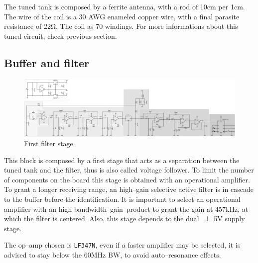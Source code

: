 The tuned tank is composed by a ferrite antenna, with a rod of \num{10}\si{\centi\meter} per \diameter \num{1}\si{\centi\meter}. The wire of the coil is a \num{30} AWG enameled copper wire, with a final parasite resistance of \num{22}\si{\ohm}. The coil as \num{70} windings. For more informations about this tuned circuit, check previous section.

\subsection{Buffer and filter}
\begin{figure}
	\centering
	\includegraphics*[viewport=170 3 1250 380,scale=0.4]{ch2/img/receiver3.pdf}
	\caption{First filter stage}
	\label{fig:filter1}
\end{figure}

This block is composed by a first stage that acts as a separation between the tuned tank and the filter, thus is also called voltage follower. To limit the number of components on the board this stage is obtained with an operational amplifier. To grant a longer receiving range, an high--gain selective active filter is in cascade to the buffer before the identification. It is important to select an operational amplifier with an high bandwidth--gain--product to grant the gain at \num{457}\si{\kilo\hertz}, at which the filter is centered. Also, this stage depends to the dual \num{\pm 5}\si{\volt} supply stage. 

The op--amp chosen is \texttt{LF347N}, even if a faster amplifier may be selected, it is advised to stay below the \num{60}\si{\mega\hertz} BW, to avoid auto--resonance effects.

